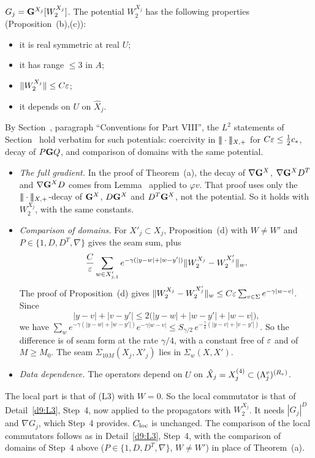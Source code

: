 \begin{detail}
\begin{step}
\end{step}
\begin{step}
$G_j=\mathbf G^{X_j}[W_2^{X_j}]$. The potential $W_2^{X_j}$ has the following properties (Proposition~(b),(c)):
\begin{itemize}
\item it is real symmetric at real $U$;
\item it has range $\le3$ in $A$;
\item $\|W_2^{X_j}\|\le C\varepsilon$;
\item it depends on $U$ on $\hat X_j$.
\end{itemize}
By Section~, paragraph ``Conventions for Part VIII'', the $L^2$ statements of Section~ hold verbatim for such potentials: coercivity in $|\!|\!|\cdot|\!|\!|_{X,+}$ for $C\varepsilon\le\frac12c_*$, decay of $P\mathbf G Q$, and comparison of domains with the same potential.
\begin{itemize}
\item \emph{The full gradient.} In the proof of Theorem~(a), the decay of $\nabla\mathbf G^X$, $\nabla\mathbf G^XD^T$ and $\nabla\mathbf G^XD$ comes from Lemma~ applied to $\varphi v$. That proof uses only the $|\!|\!|\cdot|\!|\!|_{X,+}$-decay of $\mathbf G^X$, $D\mathbf G^X$ and $D^T\mathbf G^X$, not the potential. So it holds with $W_2^{X_j}$, with the same constants.
\item \emph{Comparison of domains.} For $X'_j\subset X_j$, Proposition~(d) with $W\ne W'$ and $P\in\{1,D,D^T,\nabla\}$ gives the seam sum, plus
\[
\frac C{\varepsilon}\sum_{w\in X'_{j,1}}e^{-\gamma(|y-w|+|w-y'|)}\|W_2^{X_j}-W_2^{X'_j}\|_w .
\]
The proof of Proposition~(d) gives $\|W_2^{X_j}-W_2^{X'_j}\|_w\le C\varepsilon\sum_{v\in\Sigma}e^{-\gamma|w-v|}$. Since
\[
|y-v|+|v-y'|\le2\big(|y-w|+|w-y'|+|w-v|\big),
\]
we have $\sum_we^{-\gamma(|y-w|+|w-y'|)}e^{-\gamma|w-v|}\le S_{\gamma/2}\,e^{-\frac\gamma4(|y-v|+|v-y'|)}$. So the difference is of seam form at the rate $\gamma/4$, with a constant free of $\varepsilon$ and of $M\ge M_0$. The seam $\Sigma_{10M}(X_j,X'_j)$ lies in $\Sigma_w(X,X')$.
\item \emph{Data dependence.} The operators depend on $U$ on $\hat X_j=X_j^{(4)}\subset(\Lambda^v_j)^{(R_v)}$.
\end{itemize}
\end{step}
\begin{step}
The local part is that of (L3) with $W=0$. So the local commutator is that of Detail~\ref{d9:L3}, Step~4, now applied to the propagators with $W_2^{X_j}$. It needs $|G_j|^D$ and $\nabla G_j$, which Step~4 provides. $C_{\rm loc}$ is unchanged. The comparison of the local commutators follows as in Detail~\ref{d9:L3}, Step~4, with the comparison of domains of Step~4 above ($P\in\{1,D,D^T,\nabla\}$, $W\ne W'$) in place of Theorem~(a).

\end{step}
\end{detail}
